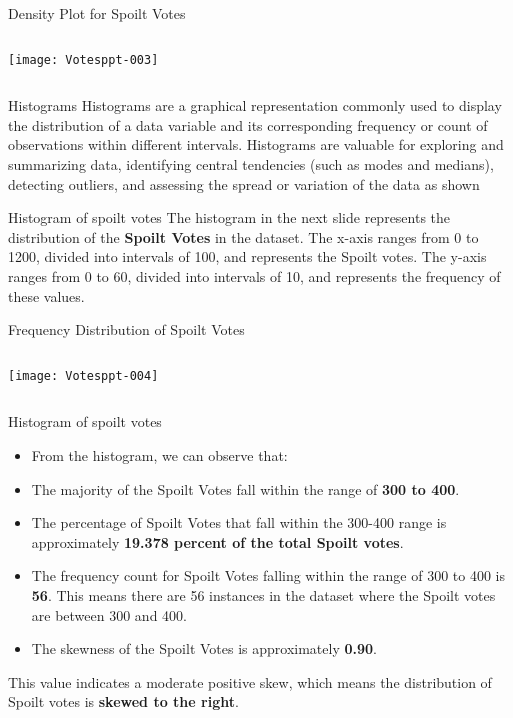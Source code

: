 \documentclass{beamer}
\begin{document}
\begin{frame}[fragile]{Density Plot for Spoilt Votes}
\begin{columns}[c] %
\texttt{[image: Votesppt-003]}
\end{columns}
\end{frame}


\begin{frame}{Histograms}
Histograms are a graphical representation commonly used to display the distribution of a data variable and its corresponding frequency or count of observations within different intervals. Histograms are valuable for exploring and summarizing data, identifying central tendencies (such as modes and medians), detecting outliers, and assessing the spread or variation of the data as shown
\end{frame}

\begin{frame}{Histogram of spoilt votes}
The histogram in the next slide represents the distribution of the \textbf {Spoilt Votes} in the dataset. The x-axis ranges from 0 to 1200, divided into intervals of 100, and represents the Spoilt votes. The y-axis ranges from 0 to 60, divided into intervals of 10, and represents the frequency of these values.
\end{frame}

\begin{frame}[fragile]{Frequency Distribution of Spoilt Votes}
\begin{columns}[c] %
\texttt{[image: Votesppt-004]}
\end{columns}
\end{frame}

\begin{frame}{Histogram of spoilt votes}
\begin{itemize}
\item From the histogram, we can observe that:
\item The majority of the Spoilt Votes fall within the range of \textbf{300 to 400}.
\item The percentage of Spoilt Votes that fall within the 300-400 range is approximately \textbf{19.378 percent of the total Spoilt votes}.
\item The frequency count for Spoilt Votes falling within the range of 300 to 400 is \textbf{56}. This means there are 56 instances in the dataset where the Spoilt votes are between 300 and 400.
\item The skewness of the Spoilt Votes is approximately \textbf{0.90}.
\end{itemize}
This value indicates a moderate positive skew, which means the distribution of Spoilt votes is \textbf{skewed to the right}.
\end{frame}
\end{document}
